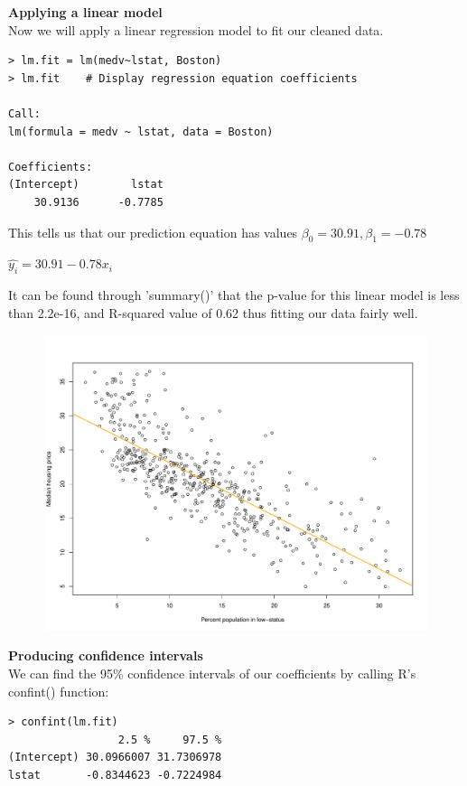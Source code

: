 \documentclass{article}
\begin{document}
{\large \bf Applying a linear model}\\
Now we will apply a linear regression model to fit our cleaned data. 

\begin{verbatim}
> lm.fit = lm(medv~lstat, Boston)
> lm.fit    # Display regression equation coefficients

Call:
lm(formula = medv ~ lstat, data = Boston)

Coefficients:
(Intercept)        lstat  
    30.9136      -0.7785  
\end{verbatim}

This tells us that our prediction equation has values 
$\beta_0 = 30.91, \beta_1 = -0.78$

\begin{center}
  $\hat{y_i} = 30.91 - 0.78x_i$
\end{center}

It can be found through 'summary()' that the p-value for this linear model is
less than 2.2e-16, and R-squared value of 0.62 thus fitting our data fairly well.
\pagebreak

\begin{figure}[!ht]
  \centering
  \includegraphics[width=0.65\linewidth]{plots/medv-vs-lstat-simple-regression.pdf}
\end{figure}


{\large \bf Producing confidence intervals} \\
We can find the 95\% confidence intervals of our coefficients by calling R's 
confint() function:

\begin{verbatim}
> confint(lm.fit)
                 2.5 %     97.5 %
(Intercept) 30.0966007 31.7306978
lstat       -0.8344623 -0.7224984
\end{verbatim}
\end{document}
